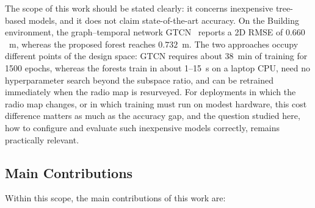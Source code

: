 The scope of this work should be stated clearly: it concerns inexpensive tree-based models, and it does not claim state-of-the-art accuracy. On the Building environment, the graph--temporal network GTCN~\cite{rana2025gtcn} reports a 2D RMSE of $0.660$~m, whereas the proposed forest reaches $0.732$~m. The two approaches occupy different points of the design space: GTCN requires about 38~min of training for 1500 epochs, whereas the forests train in about 1--15~s on a laptop CPU, need no hyperparameter search beyond the subspace ratio, and can be retrained immediately when the radio map is resurveyed. For deployments in which the radio map changes, or in which training must run on modest hardware, this cost difference matters as much as the accuracy gap, and the question studied here, how to configure and evaluate such inexpensive models correctly, remains practically relevant.


\subsection{Main Contributions}

Within this scope, the main contributions of this work are:

